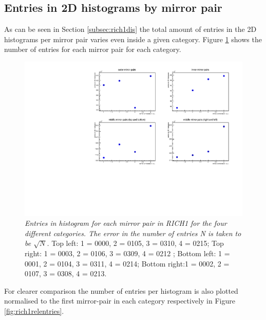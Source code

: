 \subsection{Entries in 2D histograms by mirror pair}
As can be seen in Section \ref{subsec:rich1dis} the total amount of entries in the 2D histograms per mirror pair varies even inside a given category. Figure \ref{fig:rich1entries} shows the number of entries for each mirror pair for each category.
\begin{figure}[!h]
	\vspace*{-0.5cm}
	\begin{center}
		\includegraphics[width=1.\textwidth]{entries_rich1.pdf}
		\vspace*{-1.5cm}
	\end{center}
	\caption{\textit{Entries in histogram for each mirror pair in RICH1 for the four different categories. The error in the number of entries N is taken to be $\sqrt{N}$.} Top left: 1 = 0000, 2 = 0105, 3 = 0310, 4 = 0215; Top right: 1 = 0003, 2 = 0106, 3 = 0309, 4 = 0212 ; Bottom left: 1 = 0001, 2 = 0104, 3 = 0311, 4 = 0214; Bottom right:1 = 0002, 2 = 0107, 3 = 0308, 4 = 0213. }
	\label{fig:rich1entries}
\end{figure}
For clearer comparison the number of entries per histogram is also plotted normalised to the first mirror-pair in each category respectively in Figure \ref{fig:rich1relentries}.
